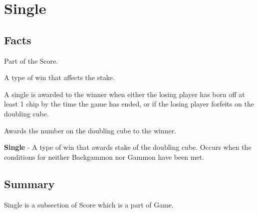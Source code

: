 \section{Single}

\subsection{Facts}
\begin{dashed}
    \item Part of the Score.
    \item A type of win that affects the stake.
    \item A single is awarded to the winner when either the losing
        player has born off at least 1 chip by the time the game has
        ended, or if the losing player forfeits on the doubling cube.
    \item Awards the number on the doubling cube to the winner.
\end{dashed}

\noindent
\newline\textbf{Single} - A type of win that awards stake
of the doubling cube. Occurs when the conditions for
neither Backgammon nor Gammon have been met.

\subsection{Summary}
Single is a subsection of Score which is a part of Game.
